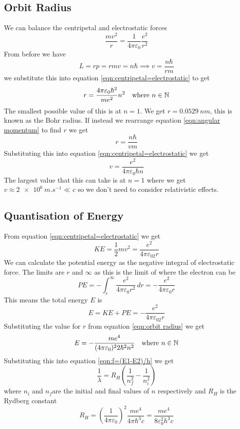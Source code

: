 \documentclass{article}
\begin{document}
    \subsection{Orbit Radius}
    We can balance the centripetal and electrostatic forces
    \begin{equation}\label{eqn:centripetal=electrostatic}
        \frac{mv^2}{r} = \frac{1}{4\pi\varepsilon_0}\frac{e^2}{r^2}
    \end{equation}
    From before we have
    \begin{equation}\label{eqn:angular momentum}
        L = rp = rmv = n\hbar\implies v = \frac{n\hbar}{rm}
    \end{equation}
    we substitute this into equation \ref{eqn:centripetal=electrostatic} to get
    \begin{equation}\label{eqn:orbit radius}
        r = \frac{4\pi\varepsilon_0\hbar^2}{me^2}n^2\quad\text{where }n\in\mathbb{N}
    \end{equation}
    The smallest possible value of this is at \(n = 1\).
    We get \(r = \SI{0.0529}{nm}\), this is known as the Bohr radius.
    If instead we rearrange equation \ref{eqn:angular momentum} to find \(r\) we get
    \[r = \frac{n\hbar}{vm}\]
    Substituting this into equation \ref{eqn:centripetal=electrostatic} we get
    \[v = \frac{e^2}{4\pi\varepsilon_0\hbar n}\]
    The largest value that this can take is at \(n = 1\) where we get \(v\approx \SI{2e6}{m.s^{-1}}\ll c\) so we don't need to consider relativistic effects.
    
    \subsection{Quantisation of Energy}
    From equation \ref{eqn:centripetal=electrostatic} we get
    \[KE = \frac{1}{2}mv^2 = \frac{e^2}{4\pi\varepsilon_02r}\]
    We can calculate the potential energy as the negative integral of electrostatic force.
    The limits are \(r\) and \(\infty\) as this is the limit of where the electron can be
    \[PE = -\int_r^\infty\frac{e^2}{4\pi\varepsilon_0 r^2}\,dr = -\frac{e^2}{4\pi\varepsilon_0 r}\]
    This means the total energy \(E\) is
    \[E = KE + PE = -\frac{e^2}{4\pi\varepsilon_02r}\]
    Substituting the value for \(r\) from equation \ref{eqn:orbit radius} we get
    \[E = -\frac{me^4}{(4\pi\varepsilon_0)^22\hbar^2n^2}\quad\text{where }n\in\mathbb{N}\]
    Substituting this into equation \ref{eqn:f=(E1-E2)/h} we get
    \[\frac{1}{\lambda} = R_H\left(\frac{1}{n_f^2} - \frac{1}{n_i^2}\right)\]
    where \(n_i\) and \(n_f\)are the initial and final values of \(n\) respectively and \(R_H\) is the Rydberg constant
    \[R_H = \left(\frac{1}{4\pi\varepsilon_0}\right)^2\frac{me^4}{4\pi\hbar^3c} = \frac{me^4}{8\varepsilon_0^2h^3c}\]
    
\end{document}

